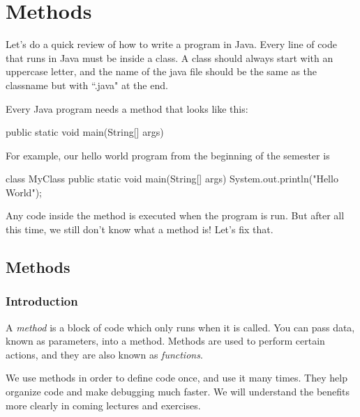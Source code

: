 \chapter{Methods}\label{ch:methods}



Let's do a quick review of how to write a program in Java. Every line of code that runs in Java must be inside a class. A class should always start with an uppercase letter, and the name of the java file should be the same as the classname but with ``.java" at the end. 

Every Java program needs a  method that looks like this:

\begin{code}
public static void main(String[] args)
\end{code}

For example, our hello world program from the beginning of the semester is 

\begin{code}
class MyClass {
  public static void main(String[] args) {
    System.out.println("Hello World");
  }
}
\end{code}

Any code inside the  method is executed when the program is run. But after all this time, we still don't know what a method is! Let's fix that. 

\section{Methods}

\subsection{Introduction}

A \emph{method} is a block of code which only runs when it is called. You can pass data, known as parameters, into a method. Methods are used to perform certain actions, and they are also known as \emph{functions}.

We use methods in order to define code once, and use it many times. They help organize code and make debugging much faster. We will understand the benefits more clearly in coming lectures and exercises. 

